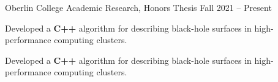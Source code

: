 \begin{entry}{Oberlin College}
	\entryItem
		{Academic Research, Honors Thesis}
		{Fall 2021 -- Present}
		
		\begin{items}
			\item Developed a \textbf{C++} algorithm for describing black-hole surfaces in high-performance computing clusters.
			\item Developed a \textbf{C++} algorithm for describing black-hole surfaces in high-performance computing clusters.
		\end{items}
\end{entry}
